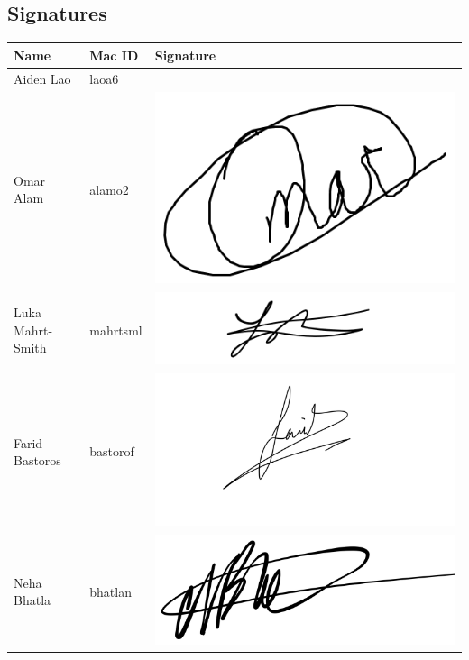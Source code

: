 \documentclass[]{article}
\begin{document}
\subsection{Signatures}
\begin{center}
	\renewcommand{\arraystretch}{1.5} %
	\begin{tabular}{|m{4cm}|m{4cm}|m{6cm}|} %
		\hline
		\textbf{Name} & \textbf{Mac ID} & \textbf{Signature} \\
		\hline
		Aiden Lao & laoa6 & \\ 
		\hline
		Omar Alam & alamo2 & \includegraphics[scale=0.3]{omar-signature.png} \\ 
		\hline
		Luka Mahrt-Smith & mahrtsml & \includegraphics[scale=0.1]{luka_signature.png}\\ 
		\hline
		Farid Bastoros & bastorof & \includegraphics[scale=0.06]{Farid Bastoros - Signature.jpeg}\\ 
		\hline
		Neha Bhatla & bhatlan & \includegraphics[scale=0.05]{neha_signature.jpeg}\\ 
		\hline
	\end{tabular}
\end{center}
\end{document}
